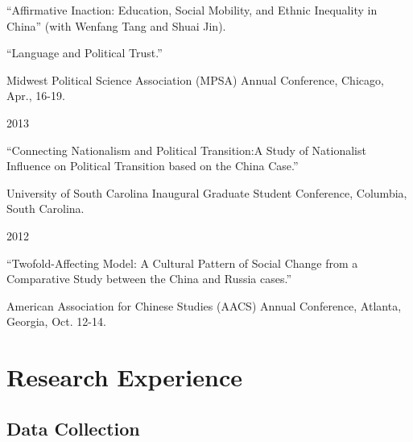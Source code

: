 \documentclass[10.5pt,]{article}
\providecommand{\tightlist}{%
  \setlength{\itemsep}{0pt}\setlength{\parskip}{0pt}}
\renewenvironment{itemize}{
  \begin{list}{}{
    \setlength{\leftmargin}{1.5em}
  }
}{
  \end{list}
}
\begin{document}
\begin{itemize}
  \begin{itemize}
  \tightlist
  \item
    ``Affirmative Inaction: Education, Social Mobility, and Ethnic
    Inequality in China'' (with Wenfang Tang and Shuai Jin).
  \item
    ``Language and Political Trust.''

    \begin{itemize}
    \tightlist
    \item
      \footnotesize Midwest Political Science Association (MPSA) Annual
      Conference, Chicago, Apr., 16-19.
    \end{itemize}
  \end{itemize}
\item
  2013

  \begin{itemize}
  \tightlist
  \item
    ``Connecting Nationalism and Political Transition:A Study of
    Nationalist Influence on Political Transition based on the China
    Case.''

    \begin{itemize}
    \tightlist
    \item
      \footnotesize University of South Carolina Inaugural Graduate
      Student Conference, Columbia, South Carolina.
    \end{itemize}
  \end{itemize}
\item
  2012

  \begin{itemize}
  \tightlist
  \item
    ``Twofold-Affecting Model: A Cultural Pattern of Social Change from
    a Comparative Study between the China and Russia cases.''

    \begin{itemize}
    \tightlist
    \item
      \footnotesize American Association for Chinese Studies (AACS)
      Annual Conference, Atlanta, Georgia, Oct. 12-14.
    \end{itemize}
  \end{itemize}
\end{itemize}

\section{Research Experience}\label{research-experience}

\subsection{Data Collection}\label{data-collection}
\end{document}
